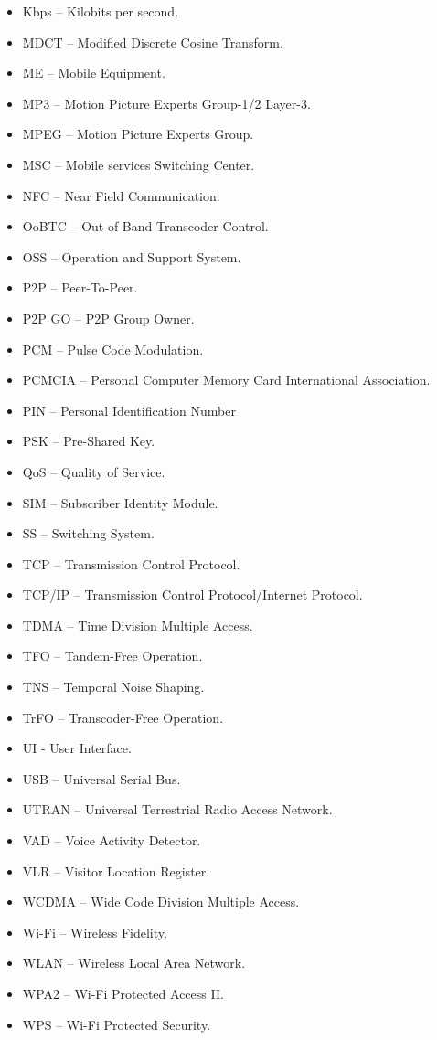 \documentclass[12pt,svgnames,smaller]{article} %
\begin{document}
\begin{itemize}
	\item Kbps – Kilobits per second.
	\item MDCT – Modified Discrete Cosine Transform.
	\item ME – Mobile Equipment.
	\item MP3 – Motion Picture Experts Group-1/2 Layer-3.
	\item MPEG – Motion Picture Experts Group. 
	\item MSC – Mobile services Switching Center.
	\item NFC – Near Field Communication.
	\item OoBTC – Out-of-Band Transcoder Control.
	\item OSS – Operation and Support System.
	\item P2P – Peer-To-Peer.
	\item P2P GO – P2P Group Owner.
	\item PCM – Pulse Code Modulation.
	\item PCMCIA – Personal Computer Memory Card International Association.
	\item PIN – Personal Identification Number
	\item PSK – Pre-Shared Key.
	\item QoS – Quality of Service.
	\item SIM – Subscriber Identity Module.
	\item SS – Switching System.
	\item TCP – Transmission Control Protocol.
	\item TCP/IP – Transmission Control Protocol/Internet Protocol. 
	\item TDMA – Time Division Multiple Access.
	\item TFO – Tandem-Free Operation.
	\item TNS – Temporal Noise Shaping. 
	\item TrFO – Transcoder-Free Operation. 
	\item UI - User Interface.
	\item USB – Universal Serial Bus.
	\item UTRAN – Universal Terrestrial Radio Access Network.
	\item VAD – Voice Activity Detector.
	\item VLR – Visitor Location Register.
	\item WCDMA – Wide Code Division Multiple Access.
	\item Wi-Fi – Wireless Fidelity.
	\item WLAN – Wireless Local Area Network.
	\item WPA2 – Wi-Fi Protected Access II.
	\item WPS – Wi-Fi Protected Security. 
\end{itemize}
\end{document}
